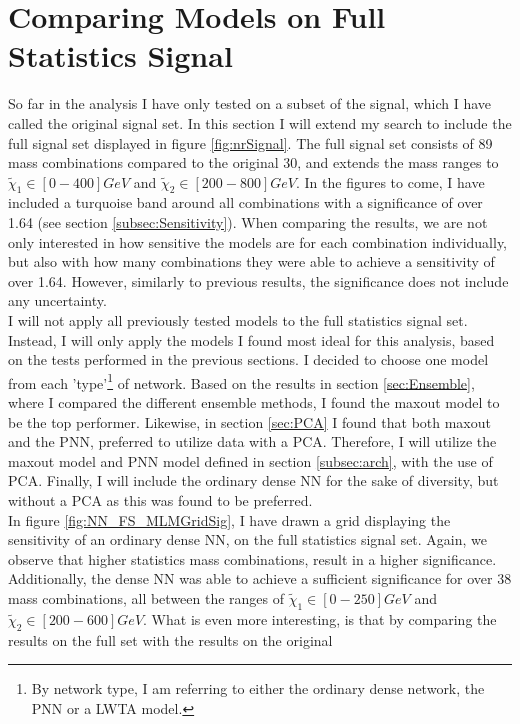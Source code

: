 \section{Comparing Models on Full Statistics Signal}\label{sec:FS}
So far in the analysis I have only tested on a subset of the signal, which I have called the original signal set. In this section 
I will extend my search to include the full signal set displayed in figure \ref{fig:nrSignal}. The full signal set consists of 89 mass 
combinations compared to the original 30, and extends the mass ranges to $\tilde{\chi}_1 \in [0-400]GeV$ and $\tilde{\chi}_2 \in [200-800]GeV$.
In the figures to come, I have included a turquoise band around all combinations with a significance of over 1.64 (see section \ref{subsec:Sensitivity}).
When comparing the results, we are not only interested in how sensitive the models are for each combination individually, but also with how many combinations 
they were able to achieve a sensitivity of over 1.64. However, similarly to previous results, the significance does not include any uncertainty.
\\
I will not apply all previously tested models to the full statistics signal set. Instead, I will only apply the models I found most ideal for this analysis, based 
on the tests performed in the previous sections. I decided to choose one model from each 'type'\footnote{By network type, I am referring to either the ordinary dense network, the 
\ac{PNN} or a \ac{LWTA} model. } of network. Based on the results in section \ref{sec:Ensemble}, where I compared the different ensemble methods, I found the maxout model to be 
the top performer. Likewise, in section \ref{sec:PCA} I found that both maxout and the \ac{PNN}, preferred to utilize data with a \ac{PCA}. Therefore, I will utilize the maxout model 
and \ac{PNN} model defined in section \ref{subsec:arch}, with the use of \ac{PCA}. Finally, I will include the ordinary dense \ac{NN} for the sake of diversity, but without a \ac{PCA} 
as this was found to be preferred.
\\
In figure \ref{fig:NN_FS_MLMGridSig}, I have drawn a grid displaying the sensitivity of an ordinary dense \ac{NN}, on the full statistics signal set. Again, we observe that higher statistics
mass combinations, result in a higher significance. Additionally, the dense \ac{NN} was able to achieve a sufficient significance for over 38 mass combinations, all between the ranges of 
$\tilde{\chi}_1 \in [0-250]GeV$ and $\tilde{\chi}_2 \in [200-600]GeV$. What is even more interesting, is that by comparing the results on the full set with the results on the original 
